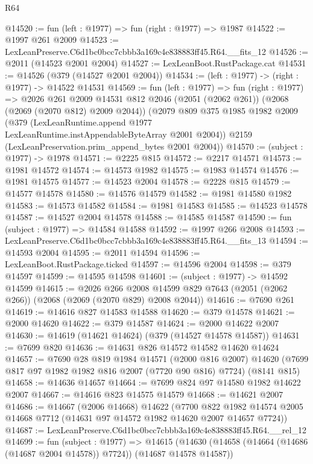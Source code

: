\begin{lexlean}{R64}
\begin{coremodule}
@14520 := fun (left : @1977) => fun (right : @1977) => @1987
@14522 := @1997 @261 @2009
@14523 := LexLeanPreserve.C6d1bc0bcc7cbbb3a169c4e838883ff45.R64.__fits_12
@14526 := @2011 (@14523 @2001 @2004)
@14527 := LexLeanBoot.RustPackage.cat
@14531 := @14526 (@379 (@14527 @2001 @2004))
@14534 := (left : @1977) -> (right : @1977) -> @14522 @14531
@14569 := fun (left : @1977) =>
  fun (right : @1977) =>
  @2026
    @261
    @2009
    @14531
    @812
    @2046
    (@2051 (@2062 @261))
    (@2068 (@2069 (@2070 @812) @2009 @2044))
    (@2079
      @809
      @375
      @1985
      @1982
      @2009
      (@379 (LexLeanRuntime.append @1977 LexLeanRuntime.instAppendableByteArray @2001 @2004))
      @2159
      (LexLeanPreservation.prim_append_bytes @2001 @2004))
@14570 := (subject : @1977) -> @1978
@14571 := @2225 @815
@14572 := @2217 @14571
@14573 := @1981 @14572
@14574 := @14573 @1982
@14575 := @1983 @14574
@14576 := @1981 @14575
@14577 := @14523 @2004
@14578 := @2228 @815
@14579 := @14577 @14578
@14580 := @14576 @14579
@14582 := @1981 @14580 @1982
@14583 := @14573 @14582
@14584 := @1981 @14583
@14585 := @14523 @14578
@14587 := @14527 @2004 @14578
@14588 := @14585 @14587
@14590 := fun (subject : @1977) => @14584 @14588
@14592 := @1997 @266 @2008
@14593 := LexLeanPreserve.C6d1bc0bcc7cbbb3a169c4e838883ff45.R64.__fits_13
@14594 := @14593 @2004
@14595 := @2011 @14594
@14596 := LexLeanBoot.RustPackage.ticked
@14597 := @14596 @2004
@14598 := @379 @14597
@14599 := @14595 @14598
@14601 := (subject : @1977) -> @14592 @14599
@14615 := @2026
    @266
    @2008
    @14599
    @829
    @7643
    (@2051 (@2062 @266))
    (@2068 (@2069 (@2070 @829) @2008 @2044))
@14616 := @7690 @261
@14619 := @14616 @827 @14583 @14588
@14620 := @379 @14578
@14621 := @2000 @14620
@14622 := @379 @14587
@14624 := @2000 @14622 @2007
@14630 := @14619 (@14621 @14624) (@379 (@14527 @14578 @14587))
@14631 := @7699 @820
@14636 := @14631 @826 @14572 @14582 @14620 @14624
@14657 := @7690
    @28
    @819
    @1984
    @14571
    (@2000 @816 @2007)
    @14620
    (@7699 @817 @97 @1982 @1982 @816 @2007 (@7720 @90 @816) @7724)
    (@8141 @815)
@14658 := @14636 @14657
@14664 := @7699 @824 @97 @14580 @1982 @14622 @2007
@14667 := @14616 @823 @14575 @14579
@14668 := @14621 @2007
@14686 := @14667
    (@2006 @14668)
    @14622
    (@7700 @822 @1982 @14574 @2005 @14668 @7712 (@14631 @97 @14572 @1982 @14620 @2007 @14657 @7724))
@14687 := LexLeanPreserve.C6d1bc0bcc7cbbb3a169c4e838883ff45.R64.__rel_12
@14699 := fun (subject : @1977) =>
  @14615 (@14630 (@14658 (@14664 (@14686 (@14687 @2004 @14578)) @7724)) (@14687 @14578 @14587))

\end{coremodule}
\end{lexlean}
